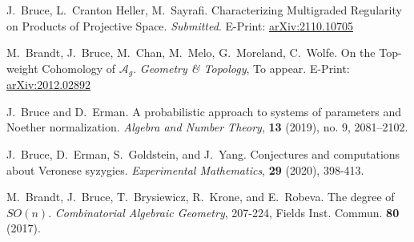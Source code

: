 \documentclass[letterpaper,12pt]{article}
\begin{document}
\begin{revnumerate}
	
\item
	J.~Bruce, L.~Cranton Heller, M.~Sayrafi. Characterizing Multigraded Regularity on Products of Projective Space.  {\it Submitted}. E-Print:  \hyperref{https://arxiv.org/abs/2110.10705}{}{}{arXiv:2110.10705}
	\vspace{-0.12in}
\item
	M.~Brandt, J.~Bruce, M.~Chan, M.~Melo, G.~Moreland, C.~Wolfe. On the Top-weight Cohomology of $\mathcal{A}_{g}$.  {\it Geometry \& Topology}, To appear. E-Print:  \hyperref{https://arxiv.org/abs/2012.02892}{}{}{arXiv:2012.02892}
		\vspace{-0.12in}
\item
	J.~Bruce and D.~Erman. A probabilistic approach to systems of parameters and Noether normalization. {\it Algebra and Number Theory}, \textbf{13} (2019), no. 9, 2081–2102.
		\vspace{-0.12in}
\item
	J.~Bruce, D.~Erman, S.~Goldstein, and J.~Yang. Conjectures and computations about Veronese syzygies.  {\it Experimental Mathematics}, \textbf{29} (2020), 398-413.
		\vspace{-0.12in}
\item
	M.~Brandt, J.~Bruce, T.~Brysiewicz, R.~Krone, and E.~Robeva. The degree of $SO(n)$. {\it Combinatorial Algebraic Geometry}, 207-224, Fields Inst. Commun. \textbf{80} (2017).
\end{revnumerate}
\end{document}

